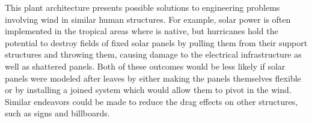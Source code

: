 This plant architecture presents possible solutions to engineering problems involving wind in similar human structures. For example, solar power is often implemented in the tropical areas where \Cxparadisi is native, but hurricanes hold the potential to destroy fields of fixed solar panels by pulling them from their support structures and throwing them, causing damage to the electrical infrastructure as well as shattered panels. Both of these outcomes would be less likely if solar panels were modeled after \Cxparadisi leaves by either making the panels themselves flexible or by installing a joined system which would allow them to pivot in the wind. Similar endeavors could be made to reduce the drag effects on other structures, such as signs and billboards.

